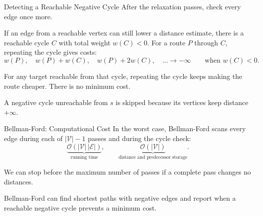 \documentclass[aspectratio=169,11pt]{beamer}
\begin{document}
\begin{frame}{Detecting a Reachable Negative Cycle}
  After the relaxation passes, check every edge once more.

  \vspace{0.7em}
  If an edge from a reachable vertex can still lower a distance estimate, there
  is a reachable cycle $C$ with total weight $w(C)<0$. For a route $P$ through $C$,
  repeating the cycle gives costs:
  \[
    w(P),\quad w(P)+w(C),\quad w(P)+2w(C),\quad\ldots
    \longrightarrow -\infty
    \qquad\text{when }w(C)<0.
  \]

  For any target reachable from that cycle, repeating the cycle keeps making
  the route cheaper. There is no minimum cost.

  \vspace{0.7em}
  A negative cycle unreachable from $s$ is skipped because its vertices keep
  distance $+\infty$.
\end{frame}

\begin{frame}{Bellman-Ford: Computational Cost}
  In the worst case, Bellman-Ford scans every edge during each of
  $|\mathcal V|-1$ passes and during the cycle check:
  \[
    \underbrace{\mathcal O(|\mathcal V|\,|\mathcal E|)}_{\text{running time}},
    \qquad
    \underbrace{\mathcal O(|\mathcal V|)}_{\text{distance and predecessor storage}}.
  \]

  \vspace{0.8em}
  We can stop before the maximum number of passes if a complete pass changes no distances.

  \vspace{0.8em}
  Bellman-Ford can find shortest paths with negative edges and report when a
  reachable negative cycle prevents a minimum cost.
\end{frame}
\end{document}
